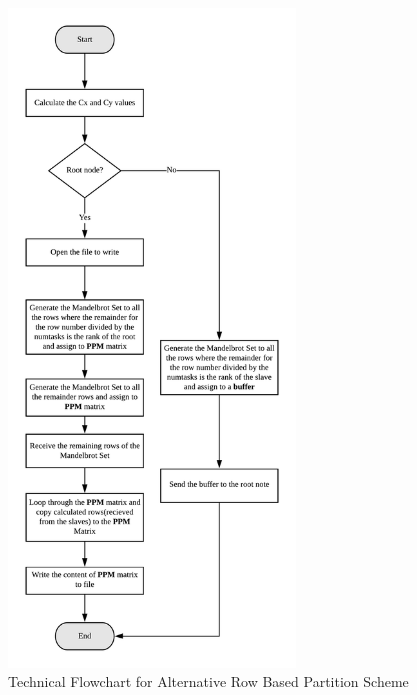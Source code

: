 \documentclass[conference]{IEEEtran}
\begin{document}
			\begin{figure}[ht]
				\centering
				\includegraphics[width=3in]{Alternating}
				\caption{Technical Flowchart for Alternative Row Based Partition Scheme}
				\label{Alte}
			\end{figure}
\end{document}

